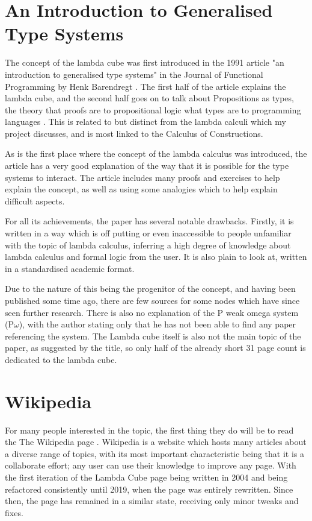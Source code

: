 \documentclass{l4proj}
\begin{document}
\section{An Introduction to Generalised Type Systems}
The concept of the lambda cube was first introduced in the 1991 article "an introduction to generalised type systems" in the Journal of Functional Programming by Henk Barendregt \cite{barendregt_introduction_1991}.  The first half of the article explains the lambda cube, and the second half goes on to talk about Propositions as types, the theory that proofs are to propositional logic what types are to programming languages \cite{props_as_types}.  This is related to but distinct from the lambda calculi which my project discusses, and is most linked to the Calculus of Constructions.

As is the first place where the concept of the lambda calculus was introduced, the article has a very good explanation of the way that it is possible for the type systems to interact.  The article includes many proofs and exercises to help explain the concept, as well as using some analogies which to help explain difficult aspects.

For all its achievements, the paper has several notable drawbacks.  Firstly, it is written in a way which is off putting or even inaccessible to people unfamiliar with the topic of lambda calculus, inferring a high degree of knowledge about lambda calculus and formal logic from the user.  It is also plain to look at, written in a standardised academic format.

Due to the nature of this being the progenitor of the concept, and having been published some time ago, there are few sources for some nodes which have since seen further research.  There is also no explanation of the P weak omega system (P\underline{$\omega$}), with the author stating only that he has not been able to find any paper referencing the system.  The Lambda cube itself is also not the main topic of the paper, as suggested by the title, so only half of the already short 31 page count is dedicated to the lambda cube.

\section{Wikipedia}

For many people interested in the topic, the first thing they do will be to read the The Wikipedia page \cite{wikipedia}.  Wikipedia is a website which hosts many articles about a diverse range of topics, with its most important characteristic being that it is a collaborate effort; any user can use their knowledge to improve any page.  With the first iteration of the Lambda Cube page being written in 2004 and being refactored consistently until 2019, when the page was entirely rewritten.  Since then, the page has remained in a similar state, receiving only minor tweaks and fixes.
\end{document}
